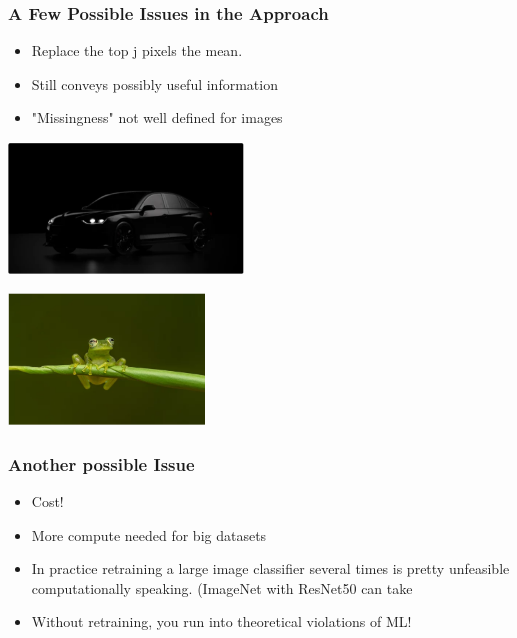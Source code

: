 \documentclass{beamer}
\theoremstyle{mystyle}
\begin{document}
\begin{frame}
    \frametitle{A Few Possible Issues in the Approach}
    \begin{itemize}
	 \item Replace the top j pixels the mean.\pause
	
        \item Still conveys possibly useful information \pause
	\item "Missingness" not well defined for images \pause
    \end{itemize}
    \begin{minipage}{0.48\textwidth}
        \centering
        \includegraphics[width=\textwidth, height=3.5cm]{black_car.png}
    \end{minipage}
    \hfill
    \begin{minipage}{0.48\textwidth}
        \centering
        \includegraphics[width=\textwidth, height=3.5cm]{green_frog2.png}
    \end{minipage}
\end{frame}
\begin{frame}
	\frametitle{Another possible Issue}
	\begin{itemize}
	\item Cost! \\
	\item More compute needed for big datasets \\
	\item In practice retraining a large image classifier several times is pretty unfeasible computationally speaking.  (ImageNet with ResNet50 can take 
	\item Without retraining, you run into theoretical violations of ML!
	\end{itemize}
\end{frame}
\end{document}
